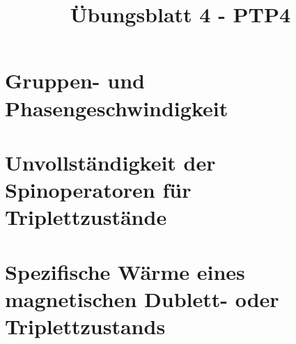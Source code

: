 \documentclass[a4paper,11pt]{article}
\title{Übungsblatt 4 - PTP4}
\author{}
\date{}
\begin{document}
\maketitle

\section{Gruppen- und Phasengeschwindigkeit}

\subsection{}

\subsection{}

\subsection{}

\section{Unvollständigkeit der Spinoperatoren für Triplettzustände}

\subsection{}

\subsection{}

\section{Spezifische Wärme eines magnetischen Dublett- oder Triplettzustands}

\subsection{}
\end{document}
